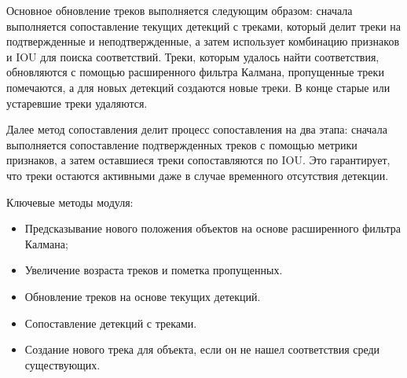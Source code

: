 Основное обновление треков выполняется следующим образом: сначала выполняется сопоставление текущих детекций с треками, который делит треки на подтвержденные и неподтвержденные, а затем использует комбинацию признаков и IOU для поиска соответствий. Треки, которым удалось найти соответствия, обновляются с помощью расширенного фильтра Калмана, пропущенные треки помечаются, а для новых детекций создаются новые треки. В конце старые или устаревшие треки удаляются.

Далее метод сопоставления делит процесс сопоставления на два этапа: сначала выполняется сопоставление подтвержденных треков с помощью метрики признаков, а затем оставшиеся треки сопоставляются по IOU. Это гарантирует, что треки остаются активными даже в случае временного отсутствия детекции.

Ключевые методы модуля:
\begin{itemize}
    \item Предсказывание нового положения объектов на основе  расширенного фильтра Калмана;
    \item Увеличение возраста треков и пометка пропущенных.
    \item Обновление треков на основе текущих детекций.
    \item Сопоставление детекций с треками.
    \item Создание нового трека для объекта, если он не нашел соответствия среди существующих.
\end{itemize}

